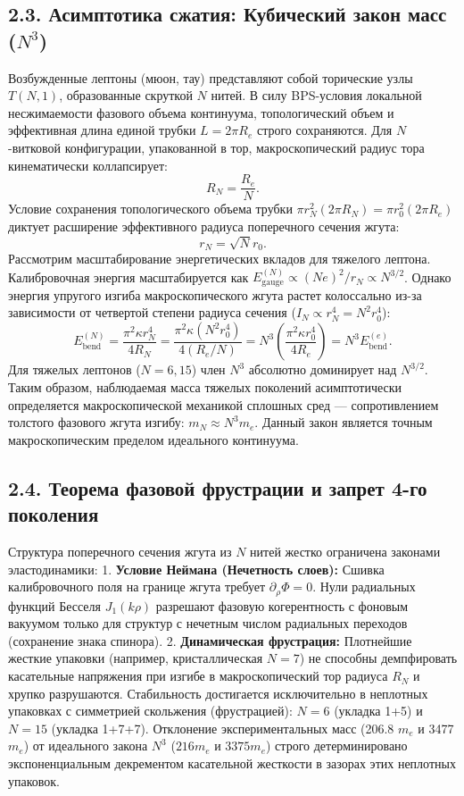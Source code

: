 \documentclass[12pt,a4paper]{article}
\begin{document}
	\subsection{2.3. Асимптотика сжатия: Кубический закон масс ($N^3$)}
	Возбужденные лептоны (мюон, тау) представляют собой торические узлы $T(N,1)$, образованные скруткой $N$ нитей. В силу BPS-условия локальной несжимаемости фазового объема континуума, топологический объем и эффективная длина единой трубки $L = 2\pi R_e$ строго сохраняются.
	Для $N$-витковой конфигурации, упакованной в тор, макроскопический радиус тора кинематически коллапсирует:
	\begin{equation}
		R_N = \frac{R_e}{N}.
	\end{equation}
	Условие сохранения топологического объема трубки $\pi r_N^2 (2\pi R_N) = \pi r_0^2 (2\pi R_e)$ диктует расширение эффективного радиуса поперечного сечения жгута:
	\begin{equation}
		r_N = \sqrt{N} r_0.
	\end{equation}
	Рассмотрим масштабирование энергетических вкладов для тяжелого лептона. Калибровочная энергия масштабируется как $E_{\text{gauge}}^{(N)} \propto (Ne)^2 / r_N \propto N^{3/2}$. Однако энергия упругого изгиба макроскопического жгута растет колоссально из-за зависимости от четвертой степени радиуса сечения ($I_N \propto r_N^4 = N^2 r_0^4$):
	\begin{equation}
		E_{\text{bend}}^{(N)} = \frac{\pi^2 \kappa r_N^4}{4 R_N} = \frac{\pi^2 \kappa (N^2 r_0^4)}{4 (R_e / N)} = N^3 \left( \frac{\pi^2 \kappa r_0^4}{4 R_e} \right) = N^3 E_{\text{bend}}^{(e)}.
		\label{eq:n3_law}
	\end{equation}
	Для тяжелых лептонов ($N=6, 15$) член $N^3$ абсолютно доминирует над $N^{3/2}$. Таким образом, наблюдаемая масса тяжелых поколений асимптотически определяется макроскопической механикой сплошных сред — сопротивлением толстого фазового жгута изгибу: $m_N \approx N^3 m_e$. Данный закон является точным макроскопическим пределом идеального континуума.
	
	\subsection{2.4. Теорема фазовой фрустрации и запрет 4-го поколения}
	Структура поперечного сечения жгута из $N$ нитей жестко ограничена законами эластодинамики:
	1. \textbf{Условие Неймана (Нечетность слоев):} Сшивка калибровочного поля на границе жгута требует $\partial_\rho \Phi = 0$. Нули радиальных функций Бесселя $J_1(k\rho)$ разрешают фазовую когерентность с фоновым вакуумом только для структур с нечетным числом радиальных переходов (сохранение знака спинора).
	2. \textbf{Динамическая фрустрация:} Плотнейшие жесткие упаковки (например, кристаллическая $N=7$) не способны демпфировать касательные напряжения при изгибе в макроскопический тор радиуса $R_N$ и хрупко разрушаются. Стабильность достигается исключительно в неплотных упаковках с симметрией скольжения (фрустрацией): $N=6$ (укладка 1+5) и $N=15$ (укладка 1+7+7).
	Отклонение экспериментальных масс (206.8 $m_e$ и 3477 $m_e$) от идеального закона $N^3$ ($216 m_e$ и $3375 m_e$) строго детерминировано экспоненциальным декрементом касательной жесткости в зазорах этих неплотных упаковок.
	
\end{document}
